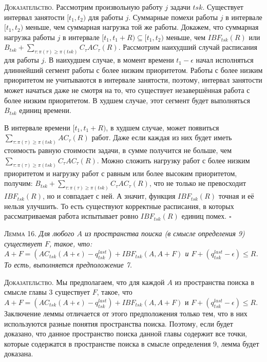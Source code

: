 \documentclass[14pt]{matmex-diploma-custom}
\begin{document}
\textsc{Доказательство.}  
  Рассмотрим произвольную работу $j$ задачи $tsk$. 
  Существует интервал занятости $[t_1, t_2)$ для работы $j$. 
  Суммарные помехи работы $j$ в интервале $[t_1, t_2)$ меньше, чем 
    суммарная нагрузка той же работы.
  Докажем, что суммарная нагрузка работы $j$ в интервале $[t_1, t_1 + R) \subseteq [t_1, t_2)$
    меньше, чем $IBF_{tsk}(R)$ или $B_{tsk} + \sum_{\tau: \pi(\tau) \geq \pi(tsk)} C_{\tau}AC_{\tau}(R)$.
  Рассмотрим наихудший случай расписания для работы $j$.
    В наихудшем случае, в момент времени $t_1 - \epsilon$ начал исполняться длиннейший 
      сегмент работы с более низким приоритетом. Работы с более низким приоритетом 
      не учитываются в интервале занятости, поэтому, интервал занятости может начаться
      даже не смотря на то, что существует незавершённая работа с более низким приоритетом.
    В худшем случае, этот сегмент будет выполняться $B_{tsk}$ единиц времени.
    
    В интервале времени $[t_1, t_1 + R)$, в худшем случае, может появиться 
      $\sum_{\tau: \pi(\tau) \geq \pi(tsk)} AC_{\tau}(R)$ работ. 
    Даже если каждая из них будет иметь стоимость равную стоимости задачи, 
      в сумме получится не больше, чем $\sum_{\tau: \pi(\tau) \geq \pi(tsk)} C_{\tau}AC_{\tau}(R)$.
    Можно сложить нагрузку работ с более низким приоритетом и нагрузку работ 
      с равным или более высоким приоритетом, получим: $B_{tsk} + \sum_{\tau: \pi(\tau) \geq \pi(tsk)} C_{\tau}AC_{\tau}(R)$,
      что не только не превосходит $IBF_{tsk}(R)$, но и совпадает с ней. 
    А значит, функция $IBF_{tsk}(R)$ точная и её нельзя улучшить. То есть 
      существуют корректные расписания, в которых рассматриваемая работа 
      испытывает ровно $IBF_{tsk}(R)$ единиц помех.
$\square$


\textsc{Лемма 16.}
\textit{Для любого $A$ из пространства поиска (в смысле определения 9)
  существует $F$, такое, что: 
    $A + F = (AC_{tsk}(A + \epsilon) - q_{tsk}^{last}) + IBF_{tsk}(A, A + F)$ 
    и $F + (q_{tsk}^{last} - \epsilon) \leq R$. 
  То есть, выполняется предположение 7. }

\textsc{Доказательство.} Мы предполагаем, что для каждой $A$ из пространства 
  поиска в смысле главы 3 существует $F$, такое, что 
    $A + F = (AC_{tsk}(A + \epsilon) - q_{tsk}^{last}) + IBF_{tsk}(A, A + F)$ 
    и $F + (q_{tsk}^{last} - \epsilon) \leq R$. 
  Заключение леммы отличается от этого предположения только тем, что 
    в них используются разные понятия пространства поиска. 
  Поэтому, если будет доказано, что данное пространство поиска данной главы 
    содержит все точки, которые содержатся в пространстве поиска в смысле определения 9, 
    лемма будет доказана.
  
\end{document}
